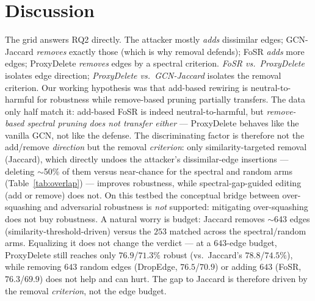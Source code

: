 \documentclass[10pt]{article}
\begin{document}
\section{Discussion}
The grid answers RQ2 directly. The attacker mostly \emph{adds} dissimilar edges; GCN-Jaccard \emph{removes}
exactly those (which is why removal defends); FoSR \emph{adds} more edges; ProxyDelete \emph{removes} edges by
a spectral criterion. \emph{FoSR vs.\ ProxyDelete} isolates edge direction; \emph{ProxyDelete vs.\
GCN-Jaccard} isolates the removal criterion. Our working hypothesis was that add-based rewiring is
neutral-to-harmful for robustness while remove-based pruning partially transfers. The data only half match
it: add-based FoSR is indeed neutral-to-harmful, but \emph{remove-based spectral pruning does not transfer
either} --- ProxyDelete behaves like the vanilla GCN, not like the defense. The discriminating factor is
therefore not the add/remove \emph{direction} but the removal \emph{criterion}: only similarity-targeted
removal (Jaccard), which directly undoes the attacker's dissimilar-edge insertions --- deleting
$\sim$50\% of them versus near-chance for the spectral and random arms (Table~\ref{tab:overlap}) ---
improves robustness, while spectral-gap-guided editing (add or remove) does not. On this testbed the conceptual bridge between
over-squashing and adversarial robustness is \emph{not} supported: mitigating over-squashing does not buy
robustness. A natural worry is budget: Jaccard removes $\sim$643 edges (similarity-threshold-driven)
versus the $253$ matched across the spectral/random arms. Equalizing it does not change the verdict ---
at a $643$-edge budget, ProxyDelete still reaches only $76.9$/$71.3\%$ robust (vs.\ Jaccard's
$78.8$/$74.5\%$), while removing $643$ random edges (DropEdge, $76.5$/$70.9$) or adding $643$ (FoSR,
$76.3$/$69.9$) does not help and can hurt. The gap to Jaccard is therefore driven by the removal
\emph{criterion}, not the edge budget.
\end{document}
